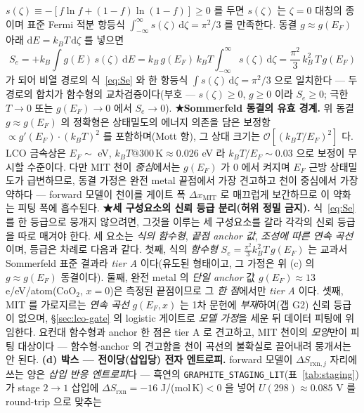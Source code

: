 \documentclass[11pt,a4paper]{article}
\newcommand{\dd}{\mathrm{d}}
\newcommand{\rxn}{\mathrm{rxn}}
\newcommand{\code}[1]{\texttt{#1}}
\begin{document}
$s(\zeta)\equiv-[f\ln f+(1-f)\ln(1-f)]\ge0$ 를 두면 $s(\zeta)$ 는 $\zeta=0$ 대칭의 종이며 표준 Fermi 적분 항등식
$\int_{-\infty}^{\infty}s(\zeta)\,\dd\zeta=\pi^2/3$ 를 만족한다. 동결 $g\approx g(E_F)$ 아래 $\dd E=k_BT\,\dd\zeta$ 를
넣으면
\begin{equation}
S_e=+k_B\int g(E)\,s(\zeta)\,\dd E
=k_B\,g(E_F)\,k_BT\!\int_{-\infty}^{\infty}\!s(\zeta)\,\dd\zeta
=\frac{\pi^2}{3}\,k_B^2\,T\,g(E_F)
\label{eq:Sedirect}
\end{equation}
가 되어 비열 경로의 식~\eqref{eq:Se} 와 한 항등식 $\int s(\zeta)\,\dd\zeta=\pi^2/3$ 으로 일치한다 — 두 경로의 합치가
함수형의 교차검증이다(부호 — $s(\zeta)\ge0$, $g\ge0$ 이라 $S_e\ge0$; 극한 $T\to0$ 또는 $g(E_F)\to0$ 에서 $S_e\to0$).
\textbf{★Sommerfeld 동결의 유효 경계.} 위 동결 $g\approx g(E_F)$ 의 정확형은 상태밀도의 에너지 의존을 담은 보정항
$\propto g'(E_F)\cdot(k_BT)^2$ 를 포함하며(Mott 항), 그 상대 크기는 $\mathcal O[(k_BT/E_F)^2]$ 다. LCO 금속상은
$E_F\sim$ eV, $k_BT@300\,\mathrm K\approx0.026$ eV 라 $k_BT/E_F\sim0.03$ 으로 보정이 무시할 수준이다. 다만 MIT 천이
\emph{중심}에서는 $g(E_F)$ 가 0 에서 켜지며 $E_F$ 근방 상태밀도가 급변하므로, 동결 가정은 완전 metal 끝점에서 가장
견고하고 천이 중심에서 가장 약하다 — forward 모델이 천이를 게이트 폭 $\Delta x_\mathrm{MIT}$ 로 매끄럽게 보간하므로 이
약화는 피팅 폭에 흡수된다. \textbf{★세 구성요소의 신뢰 등급 분리(허위 정밀 금지).}
식~\eqref{eq:Se} 를 한 등급으로 뭉개지 않으려면, 그것을 이루는 세 구성요소를 갈라 각각의 신뢰 등급을 따로 매겨야 한다.
세 요소는 \emph{식의 함수형}, \emph{끝점 anchor 값}, \emph{조성에 따른 연속 곡선}이며, 등급은 차례로 다음과 같다.
첫째, 식의 \emph{함수형} $S_e=\tfrac{\pi^2}{3}k_B^2T\,g(E_F)$ 는 교과서 Sommerfeld 표준 결과라 \emph{tier A} 이다(유도된
형태이고, 그 가정은 위 (c) 의 $g\!\approx\!g(E_F)$ 동결이다). 둘째, 완전 metal 의 \emph{단일 anchor} 값
$g(E_F)\!\approx\!13$ e/eV/atom($\mathrm{CoO_2}$, $x{=}0$)은 측정된 끝점이므로 그 \emph{한 점}에서만 \emph{tier A}
이다\cite{motohashi2009}. 셋째, MIT 를 가로지르는 \emph{연속 곡선} $g(E_F,x)$ 는 1차 문헌에 \emph{부재}하여(갭 G2)
신뢰 등급이 없으며, \S\ref{sec:lco-gate} 의 logistic 게이트로 \emph{모델 가정}을 세운 뒤 데이터 피팅에 위임한다.
요컨대 함수형과 anchor 한 점은 tier A 로 견고하고, MIT 천이의 \emph{모양}만이 피팅 대상이다 — 함수형$\cdot$anchor 의
견고함을 천이 곡선의 불확실로 끌어내려 뭉개서는 안 된다. \textbf{(d) 박스 — 전이당(삽입당) 전자 엔트로피.} forward 모델이
$\Delta S_{\rxn,j}$ 자리에 쓰는 양은 \emph{삽입 반응 엔트로피}다 — 흑연의 \code{GRAPHITE\_STAGING\_LIT}(표~\ref{tab:staging})
가 stage $2\!\to\!1$ 삽입에 $\Delta S_\rxn=-16$ J/(mol\,K)$<0$ 을 넣어 $U(298)\approx0.085$ V 를 round-trip 으로 맞추는
\end{document}
